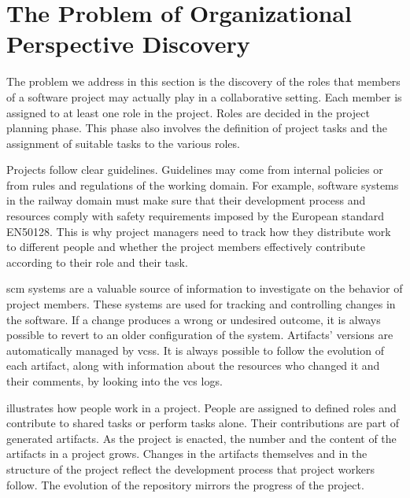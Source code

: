 \section{The Problem of Organizational Perspective Discovery}\label{sec:problemDescription}

The problem we address in this section is the discovery of the roles that members of a software project may actually play in a collaborative setting. Each member is assigned to at least one role in the project. Roles are decided in the project planning phase. This phase also involves the definition of project tasks and the assignment of suitable tasks to the various roles. 

Projects follow clear guidelines. Guidelines may come from internal policies or from rules and regulations of the working domain. For example, software systems in the railway domain must make sure that their development process and resources comply with safety requirements imposed by the European standard EN50128. This is why project managers need to track how they distribute work to different people and whether the project members effectively contribute according to their role and their task. 

\Gls*{scm} systems are a valuable source of information to investigate on the behavior of project members. These systems are used for tracking and controlling changes in the software. If a change produces a wrong or undesired outcome, it is always possible to revert to an older configuration of the system. Artifacts' versions are automatically managed by \glspl*{vcs}. It is always possible to follow the evolution of each artifact, along with information about the resources who changed it and their comments, by looking into the \gls*{vcs} logs.

 illustrates how people work in a project. People are assigned to defined roles and contribute to shared tasks or perform tasks alone. Their contributions are part of generated artifacts. As the project is enacted, the number and the content of the artifacts in a project grows. Changes in the artifacts themselves and in the structure of the project reflect the development process that project workers follow. The evolution of the repository mirrors the progress of the project.

